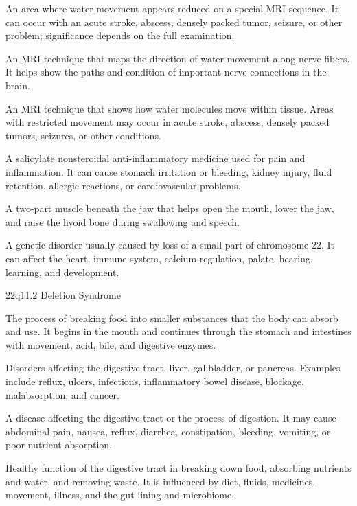  An area where water movement appears reduced on a special MRI sequence. It can occur with an acute stroke, abscess, densely packed tumor, seizure, or other problem; significance depends on the full examination.

 An MRI technique that maps the direction of water movement along nerve fibers. It helps show the paths and condition of important nerve connections in the brain.

 An MRI technique that shows how water molecules move within tissue. Areas with restricted movement may occur in acute stroke, abscess, densely packed tumors, seizures, or other conditions.

 A salicylate nonsteroidal anti-inflammatory medicine used for pain and inflammation. It can cause stomach irritation or bleeding, kidney injury, fluid retention, allergic reactions, or cardiovascular problems.

 A two-part muscle beneath the jaw that helps open the mouth, lower the jaw, and raise the hyoid bone during swallowing and speech.

 A genetic disorder usually caused by loss of a small part of chromosome 22. It can affect the heart, immune system, calcium regulation, palate, hearing, learning, and development.

\synonyms
22q11.2 Deletion Syndrome

 The process of breaking food into smaller substances that the body can absorb and use. It begins in the mouth and continues through the stomach and intestines with movement, acid, bile, and digestive enzymes.

 Disorders affecting the digestive tract, liver, gallbladder, or pancreas. Examples include reflux, ulcers, infections, inflammatory bowel disease, blockage, malabsorption, and cancer.

 A disease affecting the digestive tract or the process of digestion. It may cause abdominal pain, nausea, reflux, diarrhea, constipation, bleeding, vomiting, or poor nutrient absorption.

 Healthy function of the digestive tract in breaking down food, absorbing nutrients and water, and removing waste. It is influenced by diet, fluids, medicines, movement, illness, and the gut lining and microbiome.

